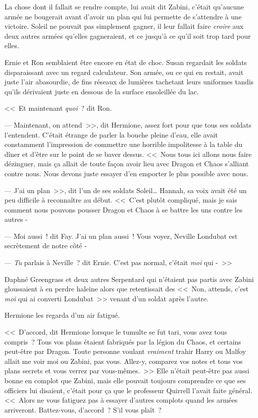 La chose dont il fallait se rendre compte, lui avait dit Zabini, c'était qu'aucune armée ne bougerait avant d'avoir un plan qui lui permette de s'attendre à une victoire. Soleil ne pouvait pas simplement gagner, il leur fallait faire \emph{croire} aux deux autres armées qu'elles gagneraient, et ce jusqu'à ce qu'il soit trop tard pour elles.

Ernie et Ron semblaient être encore en état de choc. Susan regardait les soldats disparaissant avec un regard calculateur. Son armée, ou ce qui en restait, avait juste l'air abasourdie, de fins réseaux de lumières tachetant leurs uniformes tandis qu'ils dérivaient juste en dessous de la surface ensoleillée du lac.

<<~Et maintenant \emph{quoi}~? dit Ron.

--- Maintenant, on attend~>>, dit Hermione, assez fort pour que tous ses soldats l'entendent. C'était étrange de parler la bouche pleine d'eau, elle avait constamment l'impression de commettre une horrible impolitesse à la table du dîner et d'être sur le point de se baver dessus. <<~Nous tous ici allons nous faire dézinguer, mais ça allait de toute façon avoir lieu avec Dragon et Chaos s'alliant contre nous. Nous devons juste essayer d'en emporter le plus possible avec nous.

--- J'ai un plan~>>, dit l'un de ses soldats Soleil… Hannah, sa voix avait été un peu difficile à reconnaître au début. <<~C'est plutôt compliqué, mais je sais comment nous pouvons pousser Dragon et Chaos à se battre les uns contre les autres -

--- Moi aussi~! dit Fay. J'ai un plan aussi~! Vous voyez, Neville Londubat est secrètement de notre côté -

--- \emph{Tu} parlais à Neville~? dit Ernie. C'est pas normal, c'était \emph{moi} qui -~>>

Daphné Greengrass et deux autres Serpentard qui n'étaient pas partis avec Zabini gloussaient à en perdre haleine alors que retentissait des <<~Non, attends, c'est \emph{moi} qui ai converti Londubat~>> venant d'un soldat après l'autre.

Hermione les regarda d'un air fatigué.

<<~D'accord, dit Hermione lorsque le tumulte se fut tari, vous avez tous compris~? Tous vos plans étaient fabriqués par la légion du Chaos, et certains peut-être par Dragon. Toute personne voulant \emph{vraiment} trahir Harry ou Malfoy allait me voir moi ou Zabini, pas vous. Allez-y, comparez vos notes et tous vos plans secrets et vous verrez par vous-mêmes.~>> Elle n'était peut-être pas aussi bonne en complot que Zabini, mais elle pouvait toujours comprendre ce que ses officiers lui disaient, c'était pour ça que le professeur Quirrell l'avait faite général. <<~Alors ne vous fatiguez pas à essayer d'autres complots quand les armées arriveront. Battez-vous, d'accord~? S'il vous plaît~?

